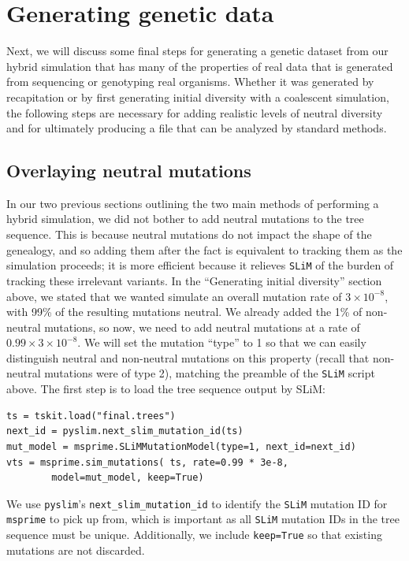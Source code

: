 \documentclass[12pt]{article}
\newcommand{\msprime}[0]{\texttt{msprime}\xspace}
\newcommand{\slim}[0]{\texttt{SLiM}\xspace}
\newcommand{\pyslim}[0]{\texttt{pyslim}\xspace}
\begin{document}
\section{Generating genetic data}

Next, we will discuss some final steps for generating a genetic dataset from our hybrid simulation that has many of the properties of real data that is generated from
sequencing or genotyping real organisms. Whether it was generated by recapitation or by first generating initial
diversity with a coalescent simulation, the following steps are necessary for adding realistic levels of neutral diversity and for ultimately producing a
file that can be analyzed by standard methods.

\subsection*{Overlaying neutral mutations}
In our two previous sections outlining the two main methods of performing a hybrid simulation, we did not bother to add neutral mutations to the tree sequence.
This is because neutral mutations do not impact the shape of the genealogy, and so adding them after the fact is equivalent to tracking them as the
simulation proceeds;
it is more efficient because it relieves \slim of the burden of tracking these irrelevant variants.
In the ``Generating initial diversity'' section above, we stated that we wanted simulate an overall mutation rate of $3 \times 10^{-8}$,
with 99\% of the resulting mutations neutral.
We already added the 1\% of non-neutral mutations, so now, we need to add neutral mutations at a rate of $0.99 \times 3 \times10^{-8}$.
We will set the mutation ``type'' to 1 so that we can easily distinguish neutral and non-neutral
mutations on this property (recall that non-neutral mutations were of type 2),
matching the preamble of the \slim script above.
The first step is to load the tree sequence output by SLiM:
\begin{verbatim}
ts = tskit.load("final.trees")
next_id = pyslim.next_slim_mutation_id(ts)
mut_model = msprime.SLiMMutationModel(type=1, next_id=next_id)
vts = msprime.sim_mutations( ts, rate=0.99 * 3e-8,
        model=mut_model, keep=True)
\end{verbatim}
We use \pyslim's \verb|next_slim_mutation_id| to identify the \slim mutation ID for \msprime to pick up from,
which is important as all \slim mutation IDs in the tree sequence must be unique.
Additionally, we include \verb|keep=True| so that existing mutations are not discarded.
\end{document}
